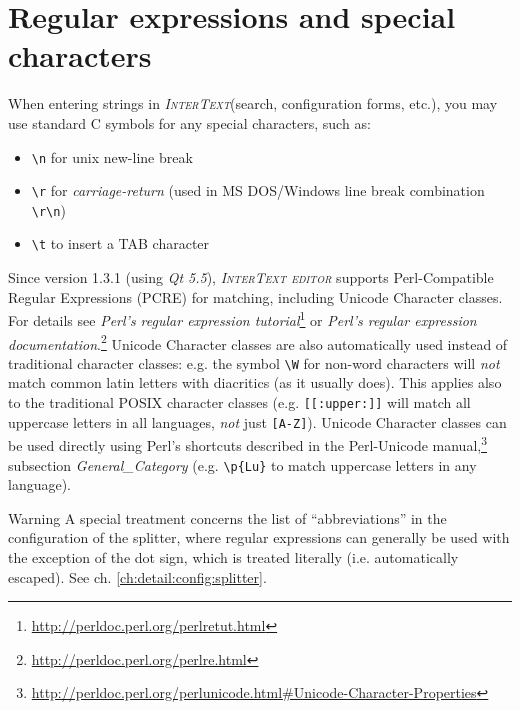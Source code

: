 \documentclass[a4paper,10pt,oneside]{book}
\newcommand{\IT}{\textit{\textsc{InterText}}\xspace}
\newcommand{\ITeditor}{\textit{\textsc{InterText editor}}\xspace}
\begin{document}
\chapter{Regular expressions and special characters}\label{ch:technical:strings}

When entering strings in \IT (search, configuration forms, etc.), you may use standard C symbols for any special characters, such as:

\begin{itemize}
 \item \texttt{\textbackslash n} for unix new-line break
 \item \texttt{\textbackslash r} for \emph{carriage-return} (used in MS DOS/Windows line break combination \texttt{\textbackslash r\textbackslash n})
 \item \texttt{\textbackslash t} to insert a TAB character
\end{itemize}

Since version 1.3.1 (using \emph{Qt 5.5}), \ITeditor supports Perl-Compatible Regular Expressions (PCRE) for matching, including Unicode Character classes. For details see \emph{Perl's regular expression tutorial}\footnote{\url{http://perldoc.perl.org/perlretut.html}} or \emph{Perl's regular expression documentation}.\footnote{\url{http://perldoc.perl.org/perlre.html}} Unicode Character classes are also automatically used instead of traditional character classes: e.g. the symbol \texttt{\textbackslash W} for non-word characters will \emph{not} match common latin letters with diacritics (as it usually does). This applies also to the traditional POSIX character classes (e.g. \texttt{[[:upper:]]} will match all uppercase letters in all languages, \emph{not} just \texttt{[A-Z]}). Unicode Character classes can be used directly using Perl's shortcuts described in the Perl-Unicode manual,\footnote{\url{http://perldoc.perl.org/perlunicode.html\#Unicode-Character-Properties}} subsection \emph{General\_Category} (e.g. \texttt{\textbackslash p\{Lu\}} to match uppercase letters in any language).

\medskip
\begin{bclogo}[couleur = blue!30, arrondi = 0.1, logo = \bcattention,
ombre = true , epOmbre = 0.125, couleurOmbre = black!30, blur, epBord = 0.3, marge = 5]{Warning}\small
A special treatment concerns the list of ``abbreviations'' in the configuration of the splitter, where regular expressions can generally be used with the exception of the dot sign, which is treated literally (i.e. automatically escaped). See ch. \ref{ch:detail:config:splitter}.
\end{bclogo}
\medskip
\end{document}
